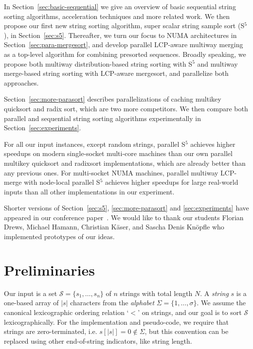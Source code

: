 \documentclass[a4paper]{myjournal}
\newcommand{\Strings}{\mathcal{S}}
\begin{document}
In Section~\ref{sec:basic-sequential} we give an overview of basic sequential
string sorting algorithms, acceleration techniques and more related work. We
then propose our first new string sorting algorithm, super scalar string sample
sort (S$^5$), in Section~\ref{sec:s5}. Thereafter, we turn our focus to NUMA
architectures in Section~\ref{sec:para-mergesort}, and develop parallel
LCP-aware multiway merging as a top-level algorithm for combining presorted
sequences. Broadly speaking, we propose both multiway distribution-based string
sorting with S$^5$ and multiway merge-based string sorting with LCP-aware
mergesort, and parallelize both approaches.

Section~\ref{sec:more-parasort} describes parallelizations of caching multikey
quicksort and radix sort, which are two more competitors. We then compare both
parallel and sequential string sorting algorithms experimentally in
Section~\ref{sec:experiments}.

For all our input instances, except random strings, parallel S$^5$ achieves
higher speedups on modern single-socket multi-core machines than our own
parallel multikey quicksort and radixsort implementations, which are already
better than any previous ones. For multi-socket NUMA machines, parallel multiway
LCP-merge with node-local parallel S$^5$ achieves higher speedups for large
real-world inputs than all other implementations in our experiment.

Shorter versions of Section~\ref{sec:s5}, \ref{sec:more-parasort} and
\ref{sec:experiments} have appeared in our conference
paper~\cite{bingmann2013parallel}.  We would like to thank our students Florian
Drews, Michael Hamann, Christian Käser, and Sascha Denis Knöpfle who implemented
prototypes of our ideas.

\section{Preliminaries}\label{sec:prelim}

Our input is a set $\Strings = \{ s_1,\ldots,s_n \}$ of $n$ strings with total
length $N$.  A \emph{string} $s$ is a one-based array of $|s|$ characters from
the \emph{alphabet} $\Sigma = \{ 1,\ldots,\sigma \}$.  We assume the canonical
lexicographic ordering relation `$<$' on strings, and our goal is to sort
$\Strings$ lexicographically.  For the implementation and pseudo-code, we
require that strings are zero-terminated, i.e. $s[|s|] = 0 \notin \Sigma$, but
this convention can be replaced using other end-of-string indicators, like
string length.
\end{document}

